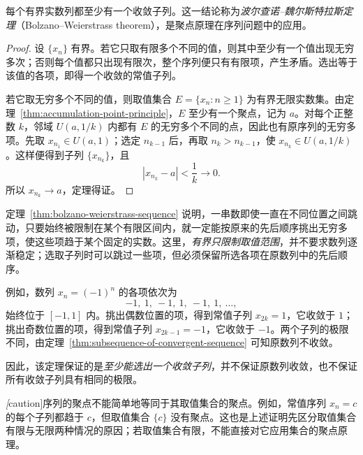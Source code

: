 \begin{theorem}
\label{thm:bolzano-weierstrass-sequence}
每个有界实数列都至少有一个收敛子列。这一结论称为\emph{波尔查诺--魏尔斯特拉斯定理}（Bolzano--Weierstrass theorem），是聚点原理在序列问题中的应用。
\end{theorem}

\begin{proof}
设 $\{x_n\}$ 有界。若它只取有限多个不同的值，则其中至少有一个值出现无穷多次；否则每个值都只出现有限次，整个序列便只有有限项，产生矛盾。选出等于该值的各项，即得一个收敛的常值子列。

若它取无穷多个不同的值，则取值集合 $E=\{x_n:n\geq1\}$ 为有界无限实数集。由定理~\ref{thm:accumulation-point-principle}，$E$ 至少有一个聚点，记为 $a$。对每个正整数 $k$，邻域 $U(a,1/k)$ 内都有 $E$ 的无穷多个不同的点，因此也有原序列的无穷多项。先取 $x_{n_1}\in U(a,1)$；选定 $n_{k-1}$ 后，再取 $n_k>n_{k-1}$，使 $x_{n_k}\in U(a,1/k)$。这样便得到子列 $\{x_{n_k}\}$，且
\[
    |x_{n_k}-a|<\frac1k\longrightarrow0.
\]
所以 $x_{n_k}\to a$，定理得证。
\end{proof}

\begin{notealert}[title={波尔查诺--魏尔斯特拉斯定理的直观理解}]
定理~\ref{thm:bolzano-weierstrass-sequence} 说明，一串数即使一直在不同位置之间跳动，只要始终被限制在某个有限区间内，就一定能按原来的先后顺序挑出无穷多项，使这些项趋于某个固定的实数。这里，\emph{有界只限制取值范围}，并不要求数列逐渐稳定；选取子列时可以跳过一些项，但必须保留所选各项在原数列中的先后顺序。

例如，数列 $x_n=(-1)^n$ 的各项依次为
\[
    -1,\ 1,\ -1,\ 1,\ -1,\ 1,\ \ldots,
\]
始终位于 $[-1,1]$ 内。挑出偶数位置的项，得到常值子列 $x_{2k}=1$，它收敛于 $1$；挑出奇数位置的项，得到常值子列 $x_{2k-1}=-1$，它收敛于 $-1$。两个子列的极限不同，由定理~\ref{thm:subsequence-of-convergent-sequence} 可知原数列不收敛。

因此，该定理保证的是\emph{至少能选出一个收敛子列}，并不保证原数列收敛，也不保证所有收敛子列具有相同的极限。
\end{notealert}

\begin{remark}
\label{rem:set-and-sequence-cluster-points}
\emph[caution]{序列的聚点不能简单地等同于其取值集合的聚点。}例如，常值序列 $x_n=c$ 的每个子列都趋于 $c$，但取值集合 $\{c\}$ 没有聚点。这也是上述证明先区分取值集合有限与无限两种情况的原因；若取值集合有限，不能直接对它应用集合的聚点原理。
\end{remark}

